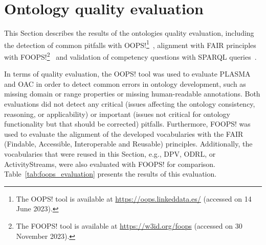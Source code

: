 \section{Ontology quality evaluation}
\label{sec:evaluation}

This Section describes the results of the ontologies quality evaluation, including the detection of common pitfalls with OOPS!\footnote{The OOPS! tool is available at \url{https://oops.linkeddata.es/} (accessed on 14 June 2023).}~\citep{poveda-villalon_oops_2014}, alignment with FAIR principles with FOOPS!\footnote{The FOOPS! tool is available at \url{https://w3id.org/foops} (accessed on 30 November 2023).}~\citep{garijo_foops_2021} and validation of competency questions with SPARQL queries~\citep{harris_sparql_2013}.

In terms of quality evaluation, the OOPS! tool was used to evaluate PLASMA and OAC in order to detect common errors in ontology development, such as missing domain or range properties or missing human-readable annotations.
Both evaluations did not detect any critical (issues affecting the ontology consistency, reasoning, or applicability) or important (issues not critical for ontology functionality but that should be corrected) pitfalls.
Furthermore, FOOPS! was used to evaluate the alignment of the developed vocabularies with the FAIR (Findable, Accessible, Interoperable and Reusable) principles.
Additionally, the vocabularies that were reused in this Section, e.g., DPV, ODRL, or ActivityStreams, were also evaluated with FOOPS! for comparison.
Table~\ref{tab:foops_evaluation} presents the results of this evaluation.

\begin{table}[htp]
    \centering
    \caption{Evaluation of the alignment of the developed and reused vocabularies with FAIR principles using FOOPS!.}
    \label{tab:foops_evaluation}
\end{table}

